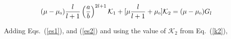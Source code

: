 
\begin{equation}\label{es2}
(\mu-\mu_{\scriptscriptstyle 0})\frac{l}{l+1}\left(\dfrac{a}{b}\right)^{2l+1}\mathcal{K}_1+[\mu\frac{l}{l+1}+\mu_{\scriptscriptstyle 0}]\mathcal{K}_2=(\mu-\mu_{\scriptscriptstyle 0})G_l
\end{equation}


Adding Eqs.~(\ref{es1}), and (\ref{es2}) and using the value of $\mathcal{K}_2$ from Eq.~(\ref{k2}),

